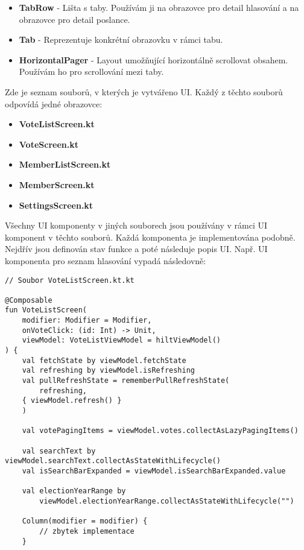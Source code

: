 \begin{itemize}
	\item \textbf{TabRow} - Lišta s taby. Používám ji na obrazovce pro detail hlasování a na obrazovce pro detail poslance.

	\item \textbf{Tab} - Reprezentuje konkrétní obrazovku v rámci tabu.

	\item \textbf{HorizontalPager} - Layout umožňující horizontálně scrollovat obsahem. Používám ho pro scrollování mezi taby.
\end{itemize}

\noindent Zde je seznam souborů, v kterých je vytvářeno UI. Každý z těchto souborů odpovídá jedné obrazovce:

\begin{itemize}
	\item \textbf{VoteListScreen.kt}
	\item \textbf{VoteScreen.kt}
	\item \textbf{MemberListScreen.kt}
	\item \textbf{MemberScreen.kt}
	\item \textbf{SettingsScreen.kt}
\end{itemize}

\noindent Všechny UI komponenty v jiných souborech jsou používány v rámci UI komponent v těchto souborů. Každá komponenta je implementována podobně. Nejdřív jsou definován stav funkce a poté následuje popis UI. Např. UI komponenta pro seznam hlasování vypadá následovně:

\begin{lstlisting}[caption={Komponenta pro seznam hlasování}, tabsize=2]
// Soubor VoteListScreen.kt.kt
	
@Composable
fun VoteListScreen(
	modifier: Modifier = Modifier,
	onVoteClick: (id: Int) -> Unit,
	viewModel: VoteListViewModel = hiltViewModel()
) {
	val fetchState by viewModel.fetchState
	val refreshing by viewModel.isRefreshing
	val pullRefreshState = rememberPullRefreshState(
		refreshing,
	{ viewModel.refresh() }
	)
	
	val votePagingItems = viewModel.votes.collectAsLazyPagingItems()
	
	val searchText by viewModel.searchText.collectAsStateWithLifecycle()
	val isSearchBarExpanded = viewModel.isSearchBarExpanded.value
	
	val electionYearRange by 
		viewModel.electionYearRange.collectAsStateWithLifecycle("")
	
	Column(modifier = modifier) {
		// zbytek implementace
	}
\end{lstlisting}

